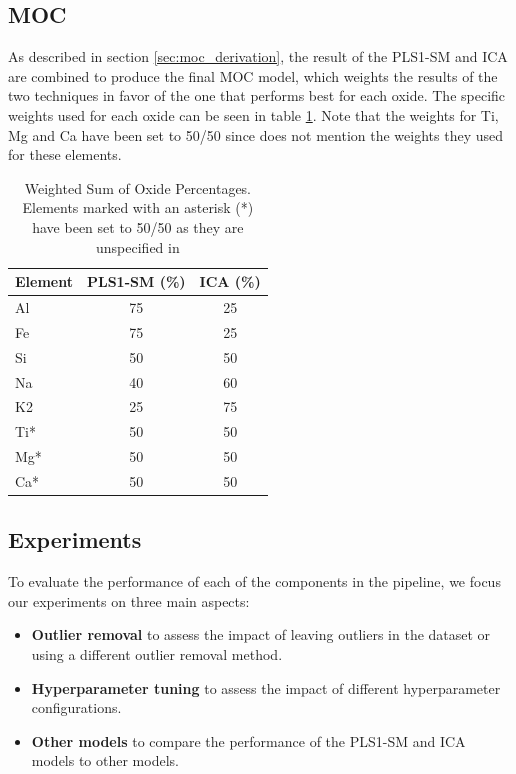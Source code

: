 \subsection{MOC}\label{sec:methodology_moc}
As described in section \ref{sec:moc_derivation}, the result of the PLS1-SM and ICA are combined to produce the final MOC model, which weights the results of the two techniques in favor of the one that performs best for each oxide.
The specific weights used for each oxide can be seen in table \ref{tab:weighted_sum_oxide}.
Note that the weights for Ti, Mg and Ca have been set to 50/50 since \citet{cleggRecalibrationMarsScience2017} does not mention the weights they used for these elements.

\begin{table}[h]
\centering
\begin{tabular*}{\columnwidth}{@{\extracolsep{\fill}}lcc}
\toprule
Element  & PLS1-SM (\%) & ICA (\%) \\ \midrule
Al       & 75           & 25      \\
Fe       & 75           & 25      \\
Si       & 50           & 50      \\
Na       & 40           & 60      \\
K2       & 25           & 75      \\
Ti*      & 50           & 50      \\
Mg*      & 50           & 50      \\
Ca*      & 50           & 50      \\
\bottomrule
\end{tabular*}
\caption{Weighted Sum of Oxide Percentages. Elements marked with an asterisk (*) have been set to 50/50 as they are unspecified in \citet{cleggRecalibrationMarsScience2017}}
\label{tab:weighted_sum_oxide}
\end{table}

\subsection{Experiments}\label{sec:methodology_experiments}
To evaluate the performance of each of the components in the pipeline, we focus our experiments on three main aspects:

\begin{itemize}
	\item \textbf{Outlier removal} to assess the impact of leaving outliers in the dataset or using a different outlier removal method.
	\item \textbf{Hyperparameter tuning} to assess the impact of different hyperparameter configurations.
	\item \textbf{Other models} to compare the performance of the PLS1-SM and ICA models to other models.
\end{itemize}

